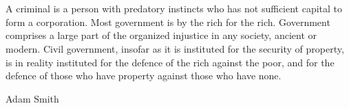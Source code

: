 \chapter{}
\epigraph{A criminal is a person with predatory instincts who has not sufficient capital to form a corporation. Most government is by the rich for the rich.
Government comprises a large part of the organized injustice in any society, ancient or modern.
Civil government, insofar as it is instituted for the security of property, is in reality instituted for the defence of the rich against the poor, and for the defence of those who have property against those who have none.}%
{Adam Smith}

\section[\Glsfmttext{oolery}]{~}
\label{gnomishPart}


